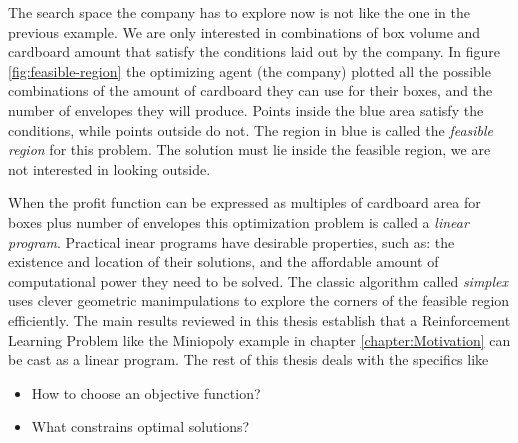 The search space the company has to explore now is not like the one in the
previous example. We are only interested in combinations of box volume and
cardboard amount that satisfy the conditions laid out by the company. In figure
\ref{fig:feasible-region} the optimizing agent (the company) plotted all the
possible combinations of the amount of cardboard they can use for their boxes,
and the number of envelopes they will produce. Points inside the blue area
satisfy the conditions, while points outside do not. The region in blue is
called the \emph{feasible region} for this problem. The solution must lie inside
the feasible region, we are not interested in looking outside.

When the profit function can be expressed as multiples of cardboard area for
boxes plus number of envelopes this optimization problem is called a
\emph{linear program}. Practical inear programs have desirable properties, such
as: the existence and location of their solutions, and the affordable amount of
computational power they need to be solved. The classic algorithm called
\emph{simplex} uses clever geometric manimpulations to explore the corners of
the feasible region efficiently. The main results reviewed in this thesis
establish that a Reinforcement Learning Problem like the Miniopoly example in
chapter \ref{chapter:Motivation} can be cast as a linear program. The rest of
this thesis deals with the specifics like
\begin{itemize}
    \item How to choose an objective function? 
    \item What constrains optimal solutions?
\end{itemize}